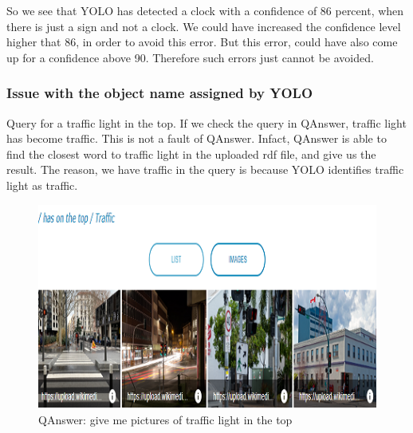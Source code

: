 \documentclass[12pt]{article}
\begin{document}
\newline
So we see that YOLO has detected a clock with a confidence of 86 percent, when there is just a sign and not a clock. We could have increased the confidence level higher that 86, in order to avoid this error. But this error, could have also come up for a confidence above 90. Therefore such errors just cannot be avoided. 
\subsubsection{Issue with the object name assigned by YOLO}
Query for a traffic light in the top. If we check the query in QAnswer, traffic light has become traffic. This is not a fault of QAnswer. Infact, QAnswer is able to find the closest word to traffic light in the uploaded rdf file, and give us the result. The reason, we have traffic in the query is because YOLO identifies traffic light as traffic.
\begin{figure}[!h]
\center
\includegraphics{topTraffic.PNG}
\caption{QAnswer: give me pictures of traffic light  in the top}
\end{figure}
\end{document}
